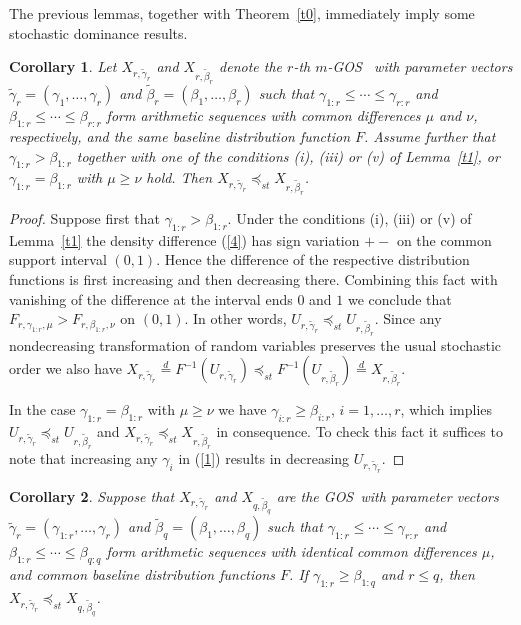 \documentclass [11pt]{article}
\newtheorem{corollary}{Corollary}
\newcommand{\gos}{GOS}
\begin{document}
The previous lemmas, together with Theorem~\ref{t0}, immediately imply some stochastic dominance results.
\begin{corollary}\label{c1}
Let $X_{r, \tilde{\gamma}_r}$ and $X_{r,\tilde{\beta}_r}$ denote the $r$-th $m$-\gos\ %
with parameter vectors $\tilde{\gamma}_r= (\gamma_1,\ldots,\gamma_r)$ and $\tilde{\beta}_r= (\beta_1,\ldots ,\beta_r)$ such that
$\gamma_{1:r} \leq \cdots \leq \gamma_{r:r}$ and $\beta_{1:r} \leq \cdots \leq \beta_{r:r}$ form arithmetic sequences with common differences $\mu$ and $\nu$, respectively, and the same baseline distribution function $F$. Assume further that $\gamma_{1:r} >\beta_{1:r}$ together with one of the conditions (i), (iii) or (v) %
of Lemma~\ref{t1}, or $\gamma_{1:r} = \beta_{1:r}$  with $\mu \geq \nu$ hold.  Then $X_{r, \tilde{\gamma}_r} \preceq_{st} X_{r,\tilde{\beta}_r}$.
\end{corollary}

\begin{proof}
Suppose first that $\gamma_{1:r} > \beta_{1:r}$. Under the conditions (i), (iii) or (v) %
of Lemma~\ref{t1} the density difference (\ref{4}) has sign variation $+-$ on the common support interval $(0,1)$. Hence the difference of the respective distribution functions 
is first increasing and then decreasing there. Combining this fact with vanishing of the difference at the interval 
ends $0$ and $1$ we conclude that  $F_{r,\gamma_{1:r},\mu}>F_{r,\beta_{1:r},\nu}$ on $(0,1)$. 
In other words, $U_{r, \tilde{\gamma}_r} \preceq_{st} U_{r,\tilde{\beta}_r}$. Since any nondecreasing transformation of random variables preserves 
the usual stochastic order we also have $X_{r, \tilde{\gamma}_r} \stackrel{d}{=} F^{-1}( U_{r, \tilde{\gamma}_r}) \preceq_{st}F^{-1}( U_{r,\tilde{\beta}_r}) \stackrel{d}{=}  X_{r,\tilde{\beta}_r}$. 

\smallskip

In the case $\gamma_{1:r} = \beta_{1:r}$ with $\mu \geq \nu$ we have $\gamma_{i:r} \geq \beta_{i:r}$, $i=1,\ldots,r$, which implies $U_{r, \tilde{\gamma}_r} \preceq_{st} U_{r,\tilde{\beta}_r}$ and $X_{r, \tilde{\gamma}_r} \preceq_{st} X_{r,\tilde{\beta}_r}$ in consequence. To check this fact it suffices to note that increasing any $\gamma_i$ in (\ref{1}) results in decreasing $ U_{r, \tilde{\gamma}_r}$.
\end{proof}%

\begin{corollary}\label{c11}
Suppose that  $X_{r, \tilde{\gamma}_r}$ and $X_{q,\tilde{\beta}_q}$ are the \gos\ with parameter vectors $\tilde{\gamma}_r= (\gamma_{1:r},\ldots,\gamma_r)$ and $\tilde{\beta}_q= (\beta_1,\ldots ,\beta_q)$ such that  $\gamma_{1:r} \leq \cdots \leq \gamma_{r:r}$ and  $\beta_{1:r} \leq \cdots \leq \beta_{q:q}$ form arithmetic sequences with identical common differences $\mu$, and  common baseline distribution functions $F$. 
If $\gamma_{1:r} \geq \beta_{1:q}$ and $r \leq q$, then $X_{r, \tilde{\gamma}_r} \preceq_{st} X_{q,\tilde{\beta}_q}$.
\end{corollary}
\end{document}
